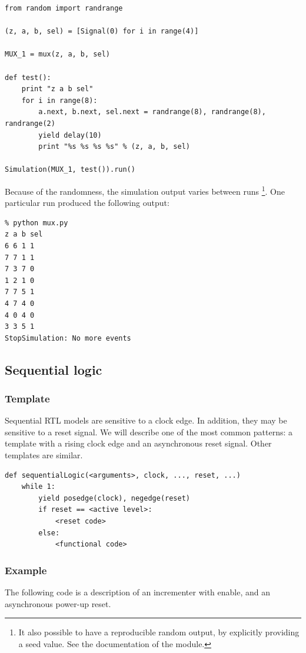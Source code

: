 \begin{verbatim}
from random import randrange

(z, a, b, sel) = [Signal(0) for i in range(4)]

MUX_1 = mux(z, a, b, sel)

def test():
    print "z a b sel"
    for i in range(8):
        a.next, b.next, sel.next = randrange(8), randrange(8), randrange(2)
        yield delay(10)
        print "%s %s %s %s" % (z, a, b, sel)
        
Simulation(MUX_1, test()).run() 
\end{verbatim}

Because of the randomness, the simulation output varies between runs
\footnote{It also possible to have a reproducible random output, by
explicitly providing a seed value. See the documentation of the
 module.}. One particular run produced the following
output:

\begin{verbatim}
% python mux.py
z a b sel
6 6 1 1
7 7 1 1
7 3 7 0
1 2 1 0
7 7 5 1
4 7 4 0
4 0 4 0
3 3 5 1
StopSimulation: No more events
\end{verbatim}


\subsection{Sequential logic \label{model-seq}}

\subsubsection{Template \label{model-seq-templ}}
Sequential RTL models are sensitive to a clock edge. In addition, they
may be sensitive to a reset signal. We will describe one of the most
common patterns: a template with a rising clock edge and an
asynchronous reset signal. Other templates are similar.

\begin{verbatim}
def sequentialLogic(<arguments>, clock, ..., reset, ...)
    while 1:
        yield posedge(clock), negedge(reset)
        if reset == <active level>:
            <reset code>
        else:
            <functional code>
\end{verbatim}


\subsubsection{Example \label{model-seq-ex}}
The following code is a description of an incrementer with enable, and
an asynchronous power-up reset.

